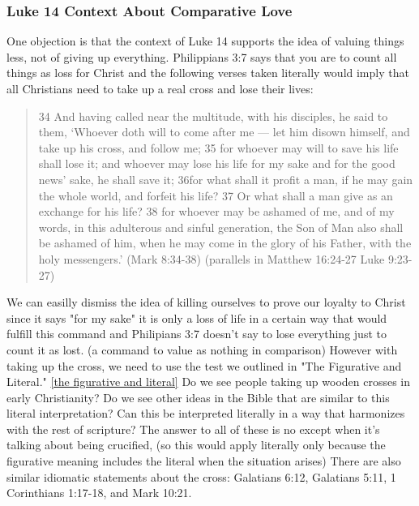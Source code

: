 \documentclass[11pt]{article}
\begin{document}
\subsubsection{Luke 14 Context About Comparative Love}
One objection is that the context of Luke 14 supports the idea of valuing things less, not of giving up everything. Philippians 3:7 says that you are to count all things as loss for Christ and the following verses taken literally would imply that all Christians need to take up a real cross and lose their lives:
\begin{quote}
34 And having called near the multitude, with his disciples, he said to them, ‘Whoever doth will to come after me — let him disown himself, and take up his cross, and follow me; 35 for whoever may will to save his life shall lose it; and whoever may lose his life for my sake and for the good news’ sake, he shall save it; 36for what shall it profit a man, if he may gain the whole world, and forfeit his life? 37 Or what shall a man give as an exchange for his life? 38 for whoever may be ashamed of me, and of my words, in this adulterous and sinful generation, the Son of Man also shall be ashamed of him, when he may come in the glory of his Father, with the holy messengers.’ (Mark 8:34-38) (parallels in Matthew 16:24-27 Luke 9:23-27)
\end{quote}
We can easilly dismiss the idea of killing ourselves to prove our loyalty to Christ since it says "for my sake" it is only a loss of life in a certain way that would fulfill this command and Philipians 3:7 doesn't say to lose everything just to count it as lost. (a command to value as nothing in comparison) However with taking up the cross, we need to use the test we outlined in "The Figurative and Literal." \ref{the figurative and literal} Do we see people taking up wooden crosses in early Christianity? Do we see other ideas in the Bible that are similar to this literal interpretation? Can this be interpreted literally in a way that harmonizes with the rest of scripture? The answer to all of these is no except when it's talking about being crucified, (so this would apply literally only because the figurative meaning includes the literal when the situation arises) There are also similar idiomatic statements about the cross: Galatians 6:12, Galatians 5:11, 1 Corinthians 1:17-18, and Mark 10:21.
\end{document}
